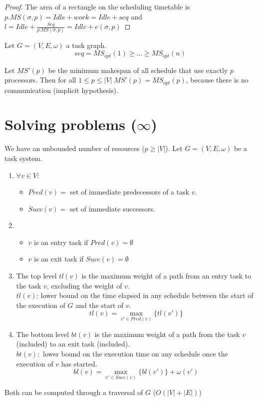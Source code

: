 \begin{proof}
The area of a rectangle on the scheduling timetable is $p.MS(\sigma, p)=Idle+work=Idle+seq$ and $l=Idle + \frac{Seq}{p.MS(\sigma,p)}=Idle+e(\sigma,p)$
\end{proof}

\begin{thm}
Let $G=(V,E,\omega)$ a task graph.
\[seq=MS_{opt}(1)\geq ... \geq MS_{opt}(n)\]
\end{thm}

Let $MS'(p)$ be the minimum makespan of all schedule that use exactly $p$ processors. Then for all $1\leq p \leq |V| \; MS'(p)=MS_{opt}(p)$, because there is no communication (implicit hypothesis).



\section{Solving problems ($\infty$)}
We have an unbounded number of resources ($p\geq |V|$). Let $G=(V,E,\omega)$ be a task system.

\begin{defi}
\begin{enumerate}
\item 
$\forall v \in V$:
\begin{itemize}
\item $Pred (v)=$ set of immediate predecessors of a task $v$.
\item $Succ(v)=$ set of immediate successors.
\end{itemize}

\item 

\begin{itemize}
\item $v$ is an entry task if $Pred(v)=\emptyset$
\item $v$ is an exit task if $Succ(v)=\emptyset$
\end{itemize}

\item The top level $tl(v)$ is the maximum weight of a path from an entry task to the task $v$, excluding the weight of $v$.\\
$tl(v)$: lower bound on the time elapsed in any schedule between the start of the execution of $G$ and the start of $v$.
\[tl(v) = \max_{ v' \in Pred(v)} \{ tl(v') \}\]

\item The bottom level $bt(v)$ is the maximum weight of a path from the task $v$ (included) to an exit task (included).\\
$bt(v):$ lower bound on the execution time on any schedule once the execution of $v$ has started.
\[bl(v) = \max_{v' \in Succ(v)} \{ bl(v') \} + \omega(v')\]

\end{enumerate}

Both can be computed through a traversal of $G$ ($O(|V|+|E|)$)
\end{defi}

